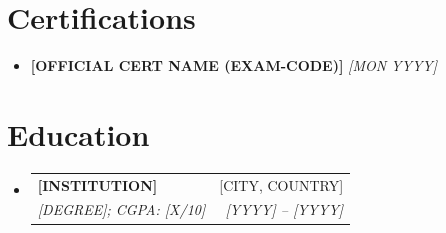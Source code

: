 \documentclass[letterpaper,11pt]{article}
\makeatletter
\newcommand{\resumeSubheading}[4]{
  \vspace{-1pt}\item
    \begin{tabular*}{0.97\textwidth}{l@{\extracolsep{\fill}}r}
      \textbf{#1} & #2 \\
      \textit{\small#3} & \textit{\small #4} \\
    \end{tabular*}\vspace{-5pt}
}
\newcommand{\resumeSubHeadingListStart}{\begin{itemize}[leftmargin=*]}
\newcommand{\resumeSubHeadingListEnd}{\end{itemize}}
\makeatother
\begin{document}
\section{Certifications}
  \resumeSubHeadingListStart
    \item\small{\textbf{[OFFICIAL CERT NAME (EXAM-CODE)]} \hfill \textit{[MON YYYY]}}
  \resumeSubHeadingListEnd

\section{Education}
  \resumeSubHeadingListStart
    \resumeSubheading
      {[INSTITUTION]}{[CITY, COUNTRY]}
      {[DEGREE]; CGPA: [X/10]}{[YYYY] -- [YYYY]}
  \resumeSubHeadingListEnd

\end{document}
